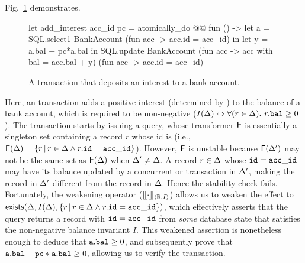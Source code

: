 Fig.~\ref{fig:weakening-example} demonstrates.
\begin{figure}[h]
\begin{center}
\begin{ocaml}
let add_interest acc_id pc = atomically_do @@ fun () ->
  let a = SQL.select1 BankAccount (fun acc -> acc.id = acc_id) in
  let y = a.bal + pc*a.bal in
  SQL.update BankAccount (fun acc -> {acc with bal = acc.bal + y})
                         (fun acc -> acc.id = acc_id)
\end{ocaml}
\end{center}
\caption{A transaction that deposits an interest to a bank account.}
\label{fig:weakening-example}
\end{figure}
Here, an  transaction adds a positive interest
(determined by ) to the balance of a bank account, which is
required to be non-negative ($I(\Delta) \Leftrightarrow
\forall(r\in\Delta).~r.{\tt bal}\ge 0$). The transaction starts by issuing
a  query, whose transformer ${\sf F}$ is essentially a singleton
set containing a record $r$ whose id is  (i.e.,
${\sf F}(\Delta) = \{r \,|\, r\in\Delta \wedge r.{\tt id} = {\tt acc\_id}\}$).
However, ${\sf F}$ is unstable because ${\sf F}(\Delta')$ may not be
the same set as ${\sf F}(\Delta)$ when $\Delta'\neq\Delta$. A record
$r\in\Delta$ whose ${\tt id}={\tt acc\_id}$ may have its balance updated by
a concurrent  or  transaction in $\Delta'$,
making the record in $\Delta'$ different from the record in $\Delta$.
Hence the stability check fails.  Fortunately, the weakening operator
($\llfloor \cdot \rrfloor_{\langle \mathbb{R},I \rangle}$) allows us to weaken the effect to
${\sf exists}(\Delta, I(\Delta), \{ r \,|\, r\in\Delta \wedge
r.{\tt id}={\tt acc\_id}\})$, which effectively asserts that the
 query returns a record with ${\tt id}={\tt acc\_id}$ from
\emph{some} database state that satisfies the non-negative balance
invariant $I$.  This weakened assertion is nonetheless enough to
deduce that ${\tt a.bal}\ge0$, and subsequently prove that ${\tt a.bal +
pc*a.bal}\ge 0$, allowing us to verify the 
transaction.

